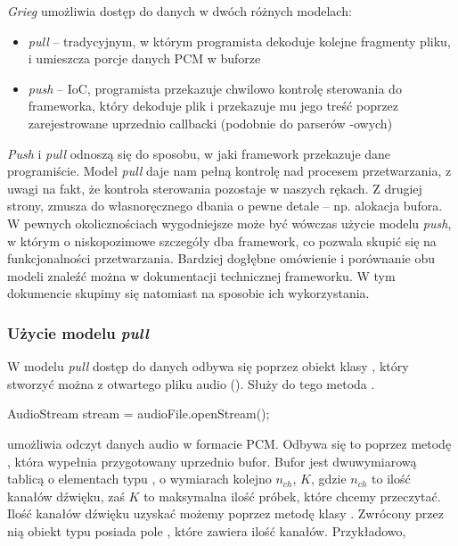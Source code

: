 \emph{Grieg} umożliwia dostęp do danych w dwóch różnych modelach:

\begin{itemize}

  \item \emph{pull} -- tradycyjnym, w którym programista dekoduje kolejne fragmenty pliku, i
    umieszcza porcje danych PCM w buforze

  \item \emph{push} -- IoC, programista przekazuje chwilowo kontrolę sterowania do frameworka, który
    dekoduje plik i przekazuje mu jego treść poprzez zarejestrowane uprzednio callbacki (podobnie do
    parserów -owych)

\end{itemize}

\emph{Push} i \emph{pull} odnoszą się do sposobu, w jaki framework przekazuje dane programiście.
Model \emph{pull} daje nam pełną kontrolę nad procesem przetwarzania, z uwagi na fakt, że kontrola
sterowania pozostaje w naszych rękach. Z drugiej strony, zmusza do własnoręcznego dbania o pewne
detale -- np.  alokacja bufora. W pewnych okolicznościach wygodniejsze może być wówczas użycie
modelu \emph{push}, w którym o niskopozimowe szczegóły dba framework, co pozwala skupić się na
funkcjonalności przetwarzania. Bardziej dogłębne omówienie i porównanie obu modeli znaleźć można w
dokumentacji technicznej frameworku. W tym dokumencie skupimy się natomiast na sposobie ich
wykorzystania.

\subsubsection{Użycie modelu \emph{pull}}

W modelu \emph{pull} dostęp do danych odbywa się poprzez obiekt klasy , który
stworzyć można z otwartego pliku audio (). Służy do tego metoda .

\begin{java}
AudioStream stream = audioFile.openStream();
\end{java}

 umożliwia odczyt danych audio w formacie PCM. Odbywa się to poprzez metodę
, która wypełnia przygotowany uprzednio bufor. Bufor jest dwuwymiarową tablicą o
elementach typu , o wymiarach kolejno $n_{ch}$, $K$, gdzie $n_{ch}$ to ilość kanałów
dźwięku, zaś $K$ to maksymalna ilość próbek, które chcemy przeczytać. Ilość kanałów dźwięku uzyskać
możemy poprzez metodę  klasy .  Zwrócony przez nią obiekt typu
 posiada pole , które zawiera ilość kanałów.  Przykładowo,

